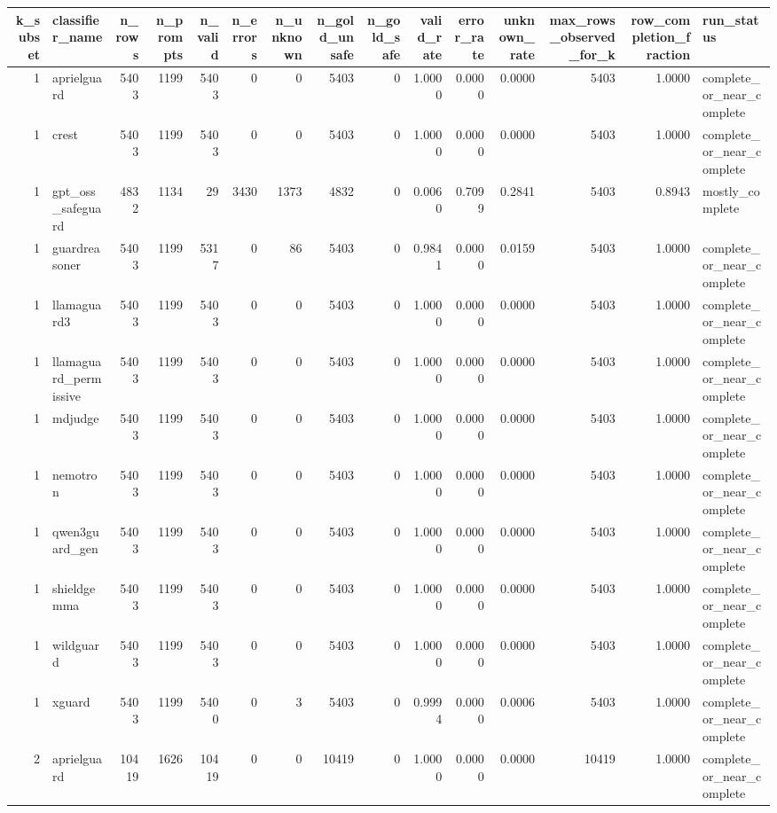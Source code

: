 \begin{tabular}{rlrrrrrrrrrrrrl}
\toprule
k\_subset & classifier\_name & n\_rows & n\_prompts & n\_valid & n\_errors & n\_unknown & n\_gold\_unsafe & n\_gold\_safe & valid\_rate & error\_rate & unknown\_rate & max\_rows\_observed\_for\_k & row\_completion\_fraction & run\_status \\
\midrule
1 & aprielguard & 5403 & 1199 & 5403 & 0 & 0 & 5403 & 0 & 1.0000 & 0.0000 & 0.0000 & 5403 & 1.0000 & complete\_or\_near\_complete \\
1 & crest & 5403 & 1199 & 5403 & 0 & 0 & 5403 & 0 & 1.0000 & 0.0000 & 0.0000 & 5403 & 1.0000 & complete\_or\_near\_complete \\
1 & gpt\_oss\_safeguard & 4832 & 1134 & 29 & 3430 & 1373 & 4832 & 0 & 0.0060 & 0.7099 & 0.2841 & 5403 & 0.8943 & mostly\_complete \\
1 & guardreasoner & 5403 & 1199 & 5317 & 0 & 86 & 5403 & 0 & 0.9841 & 0.0000 & 0.0159 & 5403 & 1.0000 & complete\_or\_near\_complete \\
1 & llamaguard3 & 5403 & 1199 & 5403 & 0 & 0 & 5403 & 0 & 1.0000 & 0.0000 & 0.0000 & 5403 & 1.0000 & complete\_or\_near\_complete \\
1 & llamaguard\_permissive & 5403 & 1199 & 5403 & 0 & 0 & 5403 & 0 & 1.0000 & 0.0000 & 0.0000 & 5403 & 1.0000 & complete\_or\_near\_complete \\
1 & mdjudge & 5403 & 1199 & 5403 & 0 & 0 & 5403 & 0 & 1.0000 & 0.0000 & 0.0000 & 5403 & 1.0000 & complete\_or\_near\_complete \\
1 & nemotron & 5403 & 1199 & 5403 & 0 & 0 & 5403 & 0 & 1.0000 & 0.0000 & 0.0000 & 5403 & 1.0000 & complete\_or\_near\_complete \\
1 & qwen3guard\_gen & 5403 & 1199 & 5403 & 0 & 0 & 5403 & 0 & 1.0000 & 0.0000 & 0.0000 & 5403 & 1.0000 & complete\_or\_near\_complete \\
1 & shieldgemma & 5403 & 1199 & 5403 & 0 & 0 & 5403 & 0 & 1.0000 & 0.0000 & 0.0000 & 5403 & 1.0000 & complete\_or\_near\_complete \\
1 & wildguard & 5403 & 1199 & 5403 & 0 & 0 & 5403 & 0 & 1.0000 & 0.0000 & 0.0000 & 5403 & 1.0000 & complete\_or\_near\_complete \\
1 & xguard & 5403 & 1199 & 5400 & 0 & 3 & 5403 & 0 & 0.9994 & 0.0000 & 0.0006 & 5403 & 1.0000 & complete\_or\_near\_complete \\
2 & aprielguard & 10419 & 1626 & 10419 & 0 & 0 & 10419 & 0 & 1.0000 & 0.0000 & 0.0000 & 10419 & 1.0000 & complete\_or\_near\_complete \\

\end{tabular}
